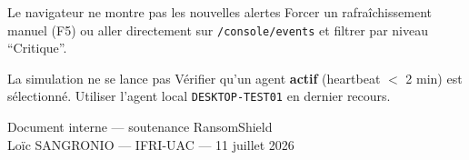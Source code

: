 \documentclass[a4paper,11pt]{article}
\newcommand{\clic}[1]{\texttt{\small #1}}
\begin{document}
\vspace{4pt}

\begin{warnbox}{Le navigateur ne montre pas les nouvelles alertes}
Forcer un rafraîchissement manuel (F5) ou aller directement sur
\clic{/console/events} et filtrer par niveau ``Critique''.
\end{warnbox}

\vspace{4pt}

\begin{warnbox}{La simulation ne se lance pas}
Vérifier qu'un agent \textbf{actif} (heartbeat $<$ 2 min) est sélectionné.
Utiliser l'agent local \texttt{DESKTOP-TEST01} en dernier recours.
\end{warnbox}

\vspace{6pt}
\begin{center}
\small\color{gray}
Document interne --- soutenance RansomShield\\
Loïc SANGRONIO --- IFRI-UAC --- 11 juillet 2026
\end{center}
\end{document}
